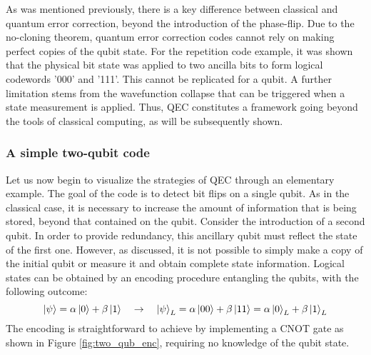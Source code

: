 As was mentioned previously, there is a key difference between classical and quantum error correction, beyond the introduction of the phase-flip. Due to the no-cloning theorem, quantum error correction codes cannot rely on making perfect copies of the qubit state. For the repetition code example, it was shown that the physical bit state was applied to two ancilla bits to form logical codewords '000' and '111'. This cannot be replicated for a qubit. A further limitation stems from the wavefunction collapse that can be triggered when a state measurement is applied. Thus, QEC constitutes a framework going beyond the tools of classical computing, as will be subsequently shown.

\subsubsection{A simple two-qubit code}

Let us now begin to visualize the strategies of QEC through an elementary example. The goal of the code is to detect bit flips on a single qubit. As in the classical case, it is necessary to increase the amount of information that is being stored, beyond that contained on the qubit. Consider the introduction of a second qubit. In order to provide redundancy, this ancillary qubit must reflect the state of the first one. However, as discussed, it is not possible to simply make a copy of the initial qubit or measure it and obtain complete state information. Logical states can be obtained by an encoding procedure entangling the qubits, with the following outcome:
\begin{equation}
    \ket{\psi}= \alpha \ket{0} +\beta \ket{1} \quad \rightarrow \quad \ket{\psi}_L = \alpha \ket{00} +\beta \ket{11}=\alpha \ket{0}_L +\beta \ket{1}_L
\end{equation}
The encoding is straightforward to achieve by implementing a CNOT gate as shown in Figure \ref{fig:two_qub_enc}, requiring no knowledge of the qubit state.

